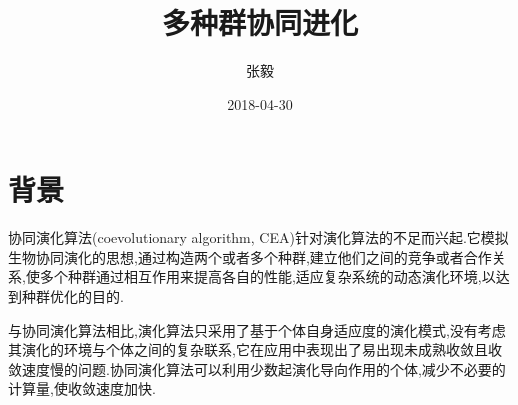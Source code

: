 \documentclass[a4paper]{article}
\title{多种群协同进化}
\date{2018-04-30}
\author{张毅}
\begin{document}
    
    \doublespacing
    \maketitle
    \newpage

    \tableofcontents
    \newpage

    \section{背景}

    协同演化算法(coevolutionary algorithm, CEA)针对演化算法的不足而兴起.它模拟生物协同演化的思想,通过构造两个或者多个种群,建立他们之间的竞争或者合作关系,使多个种群通过相互作用来提高各自的性能,适应复杂系统的动态演化环境,以达到种群优化的目的.

    与协同演化算法相比,演化算法只采用了基于个体自身适应度的演化模式,没有考虑其演化的环境与个体之间的复杂联系,它在应用中表现出了易出现未成熟收敛且收敛速度慢的问题.协同演化算法可以利用少数起演化导向作用的个体,减少不必要的计算量,使收敛速度加快.
\end{document}

